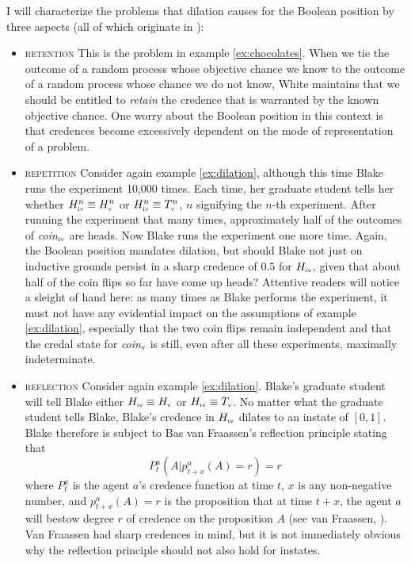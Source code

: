 \documentclass[11pt]{article}
\begin{document}
I will characterize the problems that dilation causes for the Boolean
position by three aspects (all of which originate in
):

\begin{itemize}
\item \textsc{retention} This is the problem in example
  \ref{ex:chocolates}. When we tie the outcome of a random process
  whose objective chance we know to the outcome of a random process
  whose chance we do not know, White maintains that we should be
  entitled to \emph{retain} the credence that is warranted by the
  known objective chance. One worry about the Boolean position in this
  context is that credences become excessively dependent on the mode
  of representation of a problem.
\item \textsc{repetition} Consider again example \ref{ex:dilation},
  although this time Blake runs the experiment 10,000 times. Each
  time, her graduate student tells her whether
  $H^{n}_{\mbox{\tiny{iv}}}\equiv{}H^{n}_{\mbox{\tiny{v}}}$ or
  $H^{n}_{\mbox{\tiny{iv}}}\equiv{}T^{n}_{\mbox{\tiny{v}}}$, $n$
  signifying the $n$-th experiment. After running the experiment that
  many times, approximately half of the outcomes of
  \textit{coin}$_{\mbox{\tiny{iv}}}$ are heads. Now Blake runs the
  experiment one more time. Again, the Boolean position mandates
  dilation, but should Blake not just on inductive grounds persist in
  a sharp credence of $0.5$ for $H_{\mbox{\tiny{iv}}}$, given that
  about half of the coin flips so far have come up heads? Attentive
  readers will notice a sleight of hand here: as many times as Blake
  performs the experiment, it must not have any evidential impact on
  the assumptions of example \ref{ex:dilation}, especially that the
  two coin flips remain independent and that the credal state for 
  \textit{coin}$_{\mbox{\tiny{v}}}$ is still, even after all these
  experiments, maximally indeterminate. 
\item \textsc{reflection} Consider again example \ref{ex:dilation}.
  Blake's graduate student will tell Blake either
  $H_{\mbox{\tiny{iv}}}\equiv{}H_{\mbox{\tiny{v}}}$ or
  $H_{\mbox{\tiny{iv}}}\equiv{}T_{\mbox{\tiny{v}}}$. No matter what
  the graduate student tells Blake, Blake's credence in
  $H_{\mbox{\tiny{iv}}}$ dilates to an instate of $[0,1]$. Blake
  therefore is subject to Bas van Fraassen's reflection principle
  stating that
  \begin{equation}
    \label{eq:reflection}
    P_{t}^{a}(A|p_{t+x}^{a}(A)=r)=r
  \end{equation}
  where $P_{t}^{a}$ is the agent $a$'s credence function at time $t$,
  $x$ is any non-negative number, and $p_{t+x}^{a}(A)=r$ is the
  proposition that at time $t+x$, the agent $a$ will bestow degree $r$
  of credence on the proposition $A$ (see van
  Fraassen, ). Van Fraassen had sharp
  credences in mind, but it is not immediately obvious why the
  reflection principle should not also hold for instates.
\end{itemize}
\end{document}
